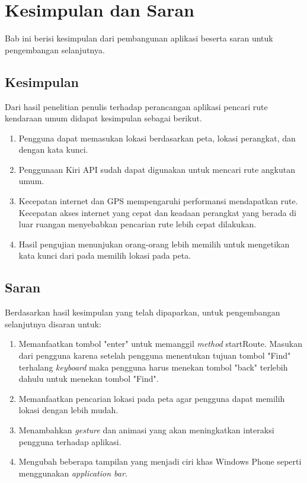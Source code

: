 \chapter{Kesimpulan dan Saran}
\label{chap:Kesimpulan dan Saran}
Bab ini berisi kesimpulan dari pembangunan aplikasi beserta saran untuk pengembangan selanjutnya.

\section{Kesimpulan}
\label{lab:Kesimpulan}
\hspace{0.5cm} Dari hasil penelitian penulis terhadap perancangan aplikasi pencari rute kendaraan umum didapat kesimpulan sebagai berikut.
\begin{enumerate}
	\item Pengguna dapat memasukan lokasi berdasarkan peta, lokasi perangkat, dan dengan kata kunci.
	\item Penggunaan Kiri API sudah dapat digunakan untuk mencari rute angkutan umum.
	\item Kecepatan internet dan GPS mempengaruhi performansi mendapatkan rute. Kecepatan akses internet yang cepat dan keadaan perangkat yang berada di luar ruangan menyebabkan pencarian rute lebih cepat dilakukan.
	\item Hasil pengujian menunjukan orang-orang lebih memilih untuk mengetikan kata kunci dari pada memilih lokasi pada peta.
\end{enumerate}

\section{Saran}
\label{lab:Saran}
\hspace{0.5cm} Berdasarkan hasil kesimpulan yang telah dipaparkan, untuk pengembangan selanjutnya disaran untuk:
\begin{enumerate}
	\item Memanfaatkan tombol "enter" untuk memanggil \textit{method} startRoute. Masukan dari pengguna karena setelah pengguna menentukan tujuan tombol "Find" terhalang \textit{keyboard} maka pengguna harus menekan tombol "back" terlebih dahulu untuk menekan tombol "Find".
	\item Memanfaatkan pencarian lokasi pada peta agar pengguna dapat memilih lokasi dengan lebih mudah.
	\item Menambahkan \textit{gesture} dan animasi yang akan meningkatkan interaksi pengguna terhadap aplikasi.
	\item Mengubah beberapa tampilan yang menjadi ciri khas Windows Phone seperti menggunakan \textit{application bar}.
\end{enumerate}